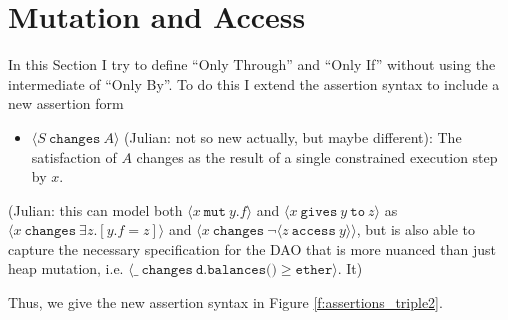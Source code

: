 \documentclass[12pt]{article}
\date{}
\newcommand\mut[3]{\langle #1\ \texttt{mut}\ #2.#3 \rangle}
\newcommand\gives[3]{\langle #1\ \texttt{gives}\ #2\ \texttt{to}\ #3 \rangle}
\newcommand\changes[2]{\langle #1\ \texttt{changes}\ #2 \rangle}
\newcommand\access[2]{\langle #1\ \texttt{access}\ #2 \rangle}
\numberwithin{case}{lemma}
\numberwithin{case}{theorem}
\numberwithin{subcase}{case}
\begin{document}
\maketitle

\section{Mutation and Access}


In this Section I try to define ``Only Through'' and ``Only If'' without using the intermediate of ``Only By''.
To do this I extend the assertion syntax to include a new assertion form
\begin{itemize}
\item
$\changes {S}{A}$ {\color{red}(Julian: not so new actually, but maybe different)}: 
The satisfaction of $A$ changes as the result of a single constrained execution step
by $x$.
\end{itemize}
{\color{red}(Julian: this can model both $\mut{x}{y}{f}$ and $\gives{x}{y}{z}$ 
as $\changes{x}{\exists z.[y.f=z]}$ and $\changes{x}{\neg \access{z}{y}}$, but 
is also able to capture the necessary specification for the DAO that is more 
nuanced than just heap mutation, i.e. 
$\changes{\_}{\texttt{d.balances()} \geq \texttt{ether}}$. It)}

\noindent Thus, we give the new assertion syntax in Figure \ref{f:assertions_triple2}.
	
\end{document}
